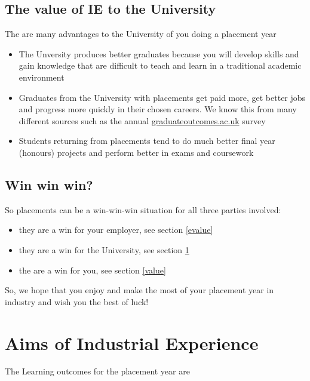 \documentclass[
]{book}
\providecommand{\tightlist}{%
  \setlength{\itemsep}{0pt}\setlength{\parskip}{0pt}}
\begin{document}
\section{The value of IE to the University}\label{uvalue}

The are many advantages to the University of you doing a placement year

\begin{itemize}
\tightlist
\item
  The Unversity produces better graduates because you will develop skills and gain knowledge that are difficult to teach and learn in a traditional academic environment
\item
  Graduates from the University with placements get paid more, get better jobs and progress more quickly in their chosen careers. We know this from many different sources such as the annual \href{https://www.graduateoutcomes.ac.uk/}{graduateoutcomes.ac.uk} survey
\item
  Students returning from placements tend to do much better final year (honours) projects and perform better in exams and coursework
\end{itemize}

\section{Win win win?}\label{win}

So placements can be a win-win-win situation for all three parties involved:

\begin{itemize}
\tightlist
\item
  they are a win for your employer, see section \ref{evalue}
\item
  they are a win for the University, see section \ref{uvalue}
\item
  the are a win for you, see section \ref{value}
\end{itemize}

So, we hope that you enjoy and make the most of your placement year in industry and wish you the best of luck!

\chapter{Aims of Industrial Experience}\label{aims}

The Learning outcomes for the placement year are
\end{document}
